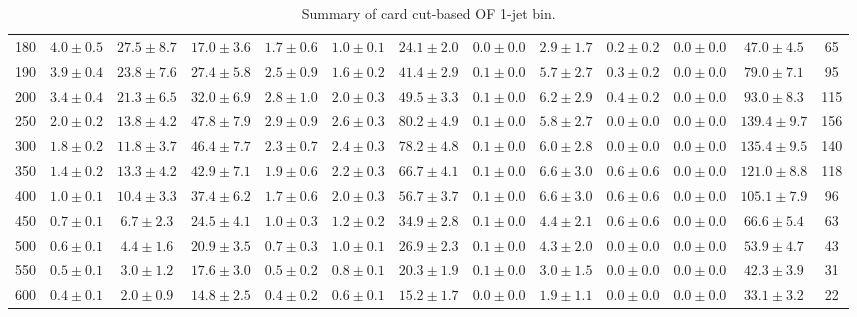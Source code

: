 \begin{table}
{\begin{center}
\begin{tabular}{l | c c | c c c c c c c c  | c c}
180 & $4.0\pm0.5$ & $27.5\pm8.7$ & $17.0\pm3.6$ & $1.7\pm0.6$ & $1.0\pm0.1$ & $24.1\pm2.0$ & $0.0\pm0.0$ & $2.9\pm1.7$ & $0.2\pm0.2$ & $0.0\pm0.0$ & $47.0\pm4.5$ & 65 \\
190 & $3.9\pm0.4$ & $23.8\pm7.6$ & $27.4\pm5.8$ & $2.5\pm0.9$ & $1.6\pm0.2$ & $41.4\pm2.9$ & $0.1\pm0.0$ & $5.7\pm2.7$ & $0.3\pm0.2$ & $0.0\pm0.0$ & $79.0\pm7.1$ & 95 \\
200 & $3.4\pm0.4$ & $21.3\pm6.5$ & $32.0\pm6.9$ & $2.8\pm1.0$ & $2.0\pm0.3$ & $49.5\pm3.3$ & $0.1\pm0.0$ & $6.2\pm2.9$ & $0.4\pm0.2$ & $0.0\pm0.0$ & $93.0\pm8.3$ & 115 \\
250 & $2.0\pm0.2$ & $13.8\pm4.2$ & $47.8\pm7.9$ & $2.9\pm0.9$ & $2.6\pm0.3$ & $80.2\pm4.9$ & $0.1\pm0.0$ & $5.8\pm2.7$ & $0.0\pm0.0$ & $0.0\pm0.0$ & $139.4\pm9.7$ & 156 \\
300 & $1.8\pm0.2$ & $11.8\pm3.7$ & $46.4\pm7.7$ & $2.3\pm0.7$ & $2.4\pm0.3$ & $78.2\pm4.8$ & $0.1\pm0.0$ & $6.0\pm2.8$ & $0.0\pm0.0$ & $0.0\pm0.0$ & $135.4\pm9.5$ & 140 \\
350 & $1.4\pm0.2$ & $13.3\pm4.2$ & $42.9\pm7.1$ & $1.9\pm0.6$ & $2.2\pm0.3$ & $66.7\pm4.1$ & $0.1\pm0.0$ & $6.6\pm3.0$ & $0.6\pm0.6$ & $0.0\pm0.0$ & $121.0\pm8.8$ & 118 \\
400 & $1.0\pm0.1$ & $10.4\pm3.3$ & $37.4\pm6.2$ & $1.7\pm0.6$ & $2.0\pm0.3$ & $56.7\pm3.7$ & $0.1\pm0.0$ & $6.6\pm3.0$ & $0.6\pm0.6$ & $0.0\pm0.0$ & $105.1\pm7.9$ & 96 \\
450 & $0.7\pm0.1$ & $6.7\pm2.3$ & $24.5\pm4.1$ & $1.0\pm0.3$ & $1.2\pm0.2$ & $34.9\pm2.8$ & $0.1\pm0.0$ & $4.4\pm2.1$ & $0.6\pm0.6$ & $0.0\pm0.0$ & $66.6\pm5.4$ & 63 \\
500 & $0.6\pm0.1$ & $4.4\pm1.6$ & $20.9\pm3.5$ & $0.7\pm0.3$ & $1.0\pm0.1$ & $26.9\pm2.3$ & $0.1\pm0.0$ & $4.3\pm2.0$ & $0.0\pm0.0$ & $0.0\pm0.0$ & $53.9\pm4.7$ & 43 \\
550 & $0.5\pm0.1$ & $3.0\pm1.2$ & $17.6\pm3.0$ & $0.5\pm0.2$ & $0.8\pm0.1$ & $20.3\pm1.9$ & $0.1\pm0.0$ & $3.0\pm1.5$ & $0.0\pm0.0$ & $0.0\pm0.0$ & $42.3\pm3.9$ & 31 \\
600 & $0.4\pm0.1$ & $2.0\pm0.9$ & $14.8\pm2.5$ & $0.4\pm0.2$ & $0.6\pm0.1$ & $15.2\pm1.7$ & $0.0\pm0.0$ & $1.9\pm1.1$ & $0.0\pm0.0$ & $0.0\pm0.0$ & $33.1\pm3.2$ & 22 \\
 \hline
 \hline
\end{tabular}
\end{center}
}
\caption{Summary of card cut-based OF 1-jet bin.}
{%
}
\end{table}
